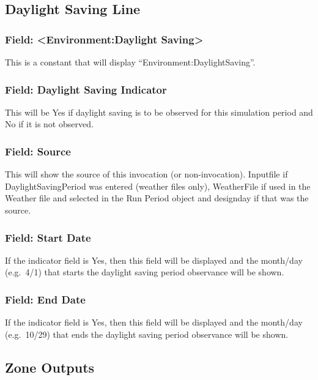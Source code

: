 \subsection{Daylight Saving Line}\label{daylight-saving-line}

\subsubsection{Field: \textless{}Environment:Daylight Saving\textgreater{}}\label{field-environmentdaylight-saving}

This is a constant that will display ``Environment:DaylightSaving''.

\subsubsection{Field: Daylight Saving Indicator}\label{field-daylight-saving-indicator}

This will be Yes if daylight saving is to be observed for this simulation period and No if it is not observed.

\subsubsection{Field: Source}\label{field-source-1}

This will show the source of this invocation (or non-invocation). Inputfile if DaylightSavingPeriod was entered (weather files only), WeatherFile if used in the Weather file and selected in the Run Period object and designday if that was the source.

\subsubsection{Field: Start Date}\label{field-start-date-2}

If the indicator field is Yes, then this field will be displayed and the month/day (e.g.~4/1) that starts the daylight saving period observance will be shown.

\subsubsection{Field: End Date}\label{field-end-date-1}

If the indicator field is Yes, then this field will be displayed and the month/day (e.g.~10/29) that ends the daylight saving period observance will be shown.

\subsection{Zone Outputs}\label{zone-outputs}

